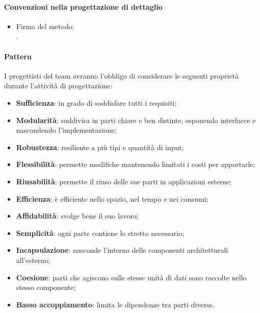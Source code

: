 \documentclass[10pt, a4paper]{article}
\begin{document}
\paragraph{Convenzioni nella progettazione di dettaglio}
\begin{itemize}
    \item Firma del metodo: \\
     .
\end{itemize}

\paragraph{Pattern}

I progettisti del team avranno l'obbligo di considerare le seguenti proprietà durante l'attività di progettazione:
\begin{itemize}
    \item \textbf{Sufficienza}: in grado di soddisfare tutti i requisiti;
    \item \textbf{Modularità}: suddivisa in parti chiare e ben distinte, esponendo interfacce e nascondendo l'implementazione;
    \item \textbf{Robustezza}: resiliente a più tipi e quantità di input;
    \item \textbf{Flessibilità}: permette modifiche mantenendo limitati i costi per apportarle;
    \item \textbf{Riusabilità}: permette il riuso delle sue parti in applicazioni esterne;
    \item \textbf{Efficienza}: è efficiente nello spazio, nel tempo e nei consumi;
    \item \textbf{Affidabilità}: svolge bene il suo lavoro;
    \item \textbf{Semplicità}: ogni parte contiene lo stretto necessario;
    \item \textbf{Incapsulazione}: nasconde l'interno delle componenti architetturali all'esterno;
    \item \textbf{Coesione}: parti che agiscono sulle stesse unità di dati sono raccolte nello stesso componente;
    \item \textbf{Basso accoppiamento}: limita le dipendenze tra parti diverse.
\end{itemize}
\end{document}
